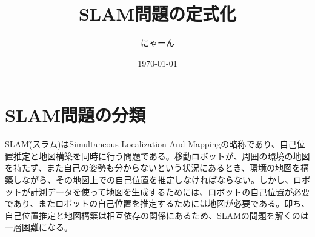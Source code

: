 \documentclass[dvipdfmx,a4paper]{jsarticle}
\title{SLAM問題の定式化}
\author{にゃーん}
\date{\today}
\begin{document}
\maketitle

\section{SLAM問題の分類}
SLAM\~(スラム)はSimultaneous Localization And Mappingの略称であり、自己位置推定と地図構築を同時に行う問題である。移動ロボットが、周囲の環境の地図を持たず、また自己の姿勢も分からないという状況にあるとき、環境の地図を構築しながら、その地図上での自己位置を推定しなければならない。しかし、ロボットが計測データを使って地図を生成するためには、ロボットの自己位置が必要であり、またロボットの自己位置を推定するためには地図が必要である。即ち、自己位置推定と地図構築は相互依存の関係にあるため、SLAMの問題を解くのは一層困難になる。
\end{document}
